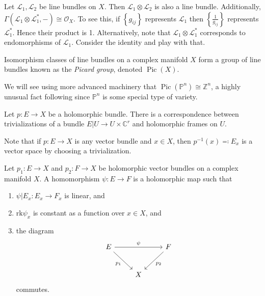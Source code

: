 \begin{remark}
	Let $\mathcal{L} _1,\mathcal{L} _2$ be line bundles on $X$. Then $\mathcal{L} _1\otimes \mathcal{L} _2$ is also a line bundle. Additionally, $\Gamma (\mathcal{L} _1\otimes \mathcal{L} _1^*,-)\cong \mathcal{O} _X$. To see this, if $\left\{ g_{ij}  \right\} $ represents $\mathcal{L} _1$ then $\left\{ \frac{1}{g_{ij} }  \right\} $ represents $\mathcal{L} _1^*$. Hence their product is 1. Alternatively, note that $\mathcal{L} _1\otimes \mathcal{L} _1^*$ corresponds to endomorphisms of $\mathcal{L} _1$. Consider the identity and play with that.
\end{remark}
\begin{definition}\label{kjasn}
	Isomorphism classes of line bundles on a complex manifold $X$ form a group of line bundles known as the \emph{Picard group}, denoted $\operatorname{Pic} (X)$.
\end{definition}
We will see using more advanced machinery that $\operatorname{Pic} (\mathbb{P} ^n)\cong \mathbb{Z} ^n$, a highly unusual fact following since $\mathbb{P} ^n$ is some special type of variety.

\begin{exercise}
	Let $p : E \to X$ be a holomorphic bundle. There is a correspondence between trivializations of a bundle $E|U \to U\times \mathbb{C} ^r$ and holomorphic frames on $U$.
\end{exercise}

\begin{notation}
	Note that if $p :  E \to X$ is any vector bundle and $x\in X$, then $p ^{-1} (x) \eqqcolon E_x$ is a vector space by choosing a trivialization.
\end{notation}

\begin{definition}\label{kaskjsa}
	Let $p_1 : E \to X$ and $p_2 : F \to X$ be holomorphic vector bundles on a complex manifold $X$. A homomorphism $\psi : E \to F$ is a holomorphic map such that
	\begin{enumerate}
		\item $\psi|E_x : E_x \to F_x$ is linear, and
		\item $\mathrm{rk}\psi _x$ is constant as a function over $x\in X$, and
		\item the diagram
			\[\begin{tikzcd}[row sep = 2.5em, column sep = 2.5em]
			E \ar[" \psi  ", rr] \ar[" p_1 "', dr]  &  & F \ar[" p_2 ", dl]  \\
			 & X & 
			\end{tikzcd}\]
			commutes.
	\end{enumerate}
\end{definition}

